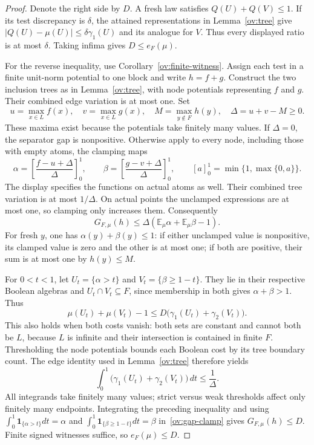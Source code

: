 \begin{proof}
Denote the right side by $D$. A fresh law satisfies $Q(U)+Q(V)\le1$. If its test discrepancy is $\delta$, the attained representations in Lemma~\ref{ov:tree} give $|Q(U)-\mu(U)|\le\delta\gamma_1(U)$ and its analogue for $V$. Thus every displayed ratio is at most $\delta$. Taking infima gives $D\le e_F(\mu)$.

For the reverse inequality, use Corollary~\ref{ov:finite-witness}. Assign each test in a finite unit-norm potential to one block and write $h=f+g$. Construct the two inclusion trees as in Lemma~\ref{ov:tree}, with node potentials representing $f$ and $g$. Their combined edge variation is at most one. Set
\[
 u=\max_{x\in L}f(x),\quad v=\max_{x\in L}g(x),\quad
 M=\max_{y\notin F}h(y),\quad \Delta=u+v-M\ge0.
\]
These maxima exist because the potentials take finitely many values. If $\Delta=0$, the separator gap is nonpositive. Otherwise apply to every node, including those with empty atoms, the clamping maps
\[
 \alpha=\left[\frac{f-u+\Delta}{\Delta}\right]_0^1,
 \qquad
 \beta=\left[\frac{g-v+\Delta}{\Delta}\right]_0^1,
 \qquad [a]_0^1=\min\{1,\max\{0,a\}\}.
\]
The display specifies the functions on actual atoms as well. Their combined tree variation is at most $1/\Delta$. On actual points the unclamped expressions are at most one, so clamping only increases them. Consequently
\begin{equation}\label{ov:gap-clamp}
 G_{F,\mu}(h)\le\Delta(\mathbb E_\mu\alpha+\mathbb E_\mu\beta-1).
\end{equation}
For fresh $y$, one has $\alpha(y)+\beta(y)\le1$: if either unclamped value is nonpositive, its clamped value is zero and the other is at most one; if both are positive, their sum is at most one by $h(y)\le M$.

For $0<t<1$, let $U_t=\{\alpha>t\}$ and $V_t=\{\beta\ge1-t\}$. They lie in their respective Boolean algebras and $U_t\cap V_t\subseteq F$, since membership in both gives $\alpha+\beta>1$. Thus
\[
 \mu(U_t)+\mu(V_t)-1\le D\bigl(\gamma_1(U_t)+\gamma_2(V_t)\bigr).
\]
This also holds when both costs vanish: both sets are constant and cannot both be $L$, because $L$ is infinite and their intersection is contained in finite $F$. Thresholding the node potentials bounds each Boolean cost by its tree boundary count. The edge identity used in Lemma~\ref{ov:tree} therefore yields
\[
 \int_0^1\bigl(\gamma_1(U_t)+\gamma_2(V_t)\bigr)\,dt
 \le\frac1\Delta.
\]
All integrands take finitely many values; strict versus weak thresholds affect only finitely many endpoints. Integrating the preceding inequality and using
$\int_0^1\mathbf1_{\{\alpha>t\}}dt=\alpha$ and
$\int_0^1\mathbf1_{\{\beta\ge1-t\}}dt=\beta$
in~\eqref{ov:gap-clamp} gives $G_{F,\mu}(h)\le D$. Finite signed witnesses suffice, so $e_F(\mu)\le D$.


\end{proof}
